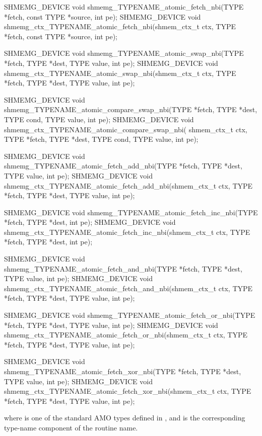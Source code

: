 \begin{apidefinition}
\begin{Csynopsis}
SHMEMG_DEVICE void shmemg_TYPENAME_atomic_fetch_nbi(TYPE *fetch,
    const TYPE *source, int pe);
SHMEMG_DEVICE void shmemg_ctx_TYPENAME_atomic_fetch_nbi(shmem_ctx_t ctx,
    TYPE *fetch, const TYPE *source, int pe);

SHMEMG_DEVICE void shmemg_TYPENAME_atomic_swap_nbi(TYPE *fetch,
    TYPE *dest, TYPE value, int pe);
SHMEMG_DEVICE void shmemg_ctx_TYPENAME_atomic_swap_nbi(shmem_ctx_t ctx,
    TYPE *fetch, TYPE *dest, TYPE value, int pe);

SHMEMG_DEVICE void shmemg_TYPENAME_atomic_compare_swap_nbi(TYPE *fetch,
    TYPE *dest, TYPE cond, TYPE value, int pe);
SHMEMG_DEVICE void shmemg_ctx_TYPENAME_atomic_compare_swap_nbi(
    shmem_ctx_t ctx, TYPE *fetch, TYPE *dest, TYPE cond,
    TYPE value, int pe);

SHMEMG_DEVICE void shmemg_TYPENAME_atomic_fetch_add_nbi(TYPE *fetch,
    TYPE *dest, TYPE value, int pe);
SHMEMG_DEVICE void shmemg_ctx_TYPENAME_atomic_fetch_add_nbi(shmem_ctx_t ctx,
    TYPE *fetch, TYPE *dest, TYPE value, int pe);

SHMEMG_DEVICE void shmemg_TYPENAME_atomic_fetch_inc_nbi(TYPE *fetch,
    TYPE *dest, int pe);
SHMEMG_DEVICE void shmemg_ctx_TYPENAME_atomic_fetch_inc_nbi(shmem_ctx_t ctx,
    TYPE *fetch, TYPE *dest, int pe);

SHMEMG_DEVICE void shmemg_TYPENAME_atomic_fetch_and_nbi(TYPE *fetch,
    TYPE *dest, TYPE value, int pe);
SHMEMG_DEVICE void shmemg_ctx_TYPENAME_atomic_fetch_and_nbi(shmem_ctx_t ctx,
    TYPE *fetch, TYPE *dest, TYPE value, int pe);

SHMEMG_DEVICE void shmemg_TYPENAME_atomic_fetch_or_nbi(TYPE *fetch,
    TYPE *dest, TYPE value, int pe);
SHMEMG_DEVICE void shmemg_ctx_TYPENAME_atomic_fetch_or_nbi(shmem_ctx_t ctx,
    TYPE *fetch, TYPE *dest, TYPE value, int pe);

SHMEMG_DEVICE void shmemg_TYPENAME_atomic_fetch_xor_nbi(TYPE *fetch,
    TYPE *dest, TYPE value, int pe);
SHMEMG_DEVICE void shmemg_ctx_TYPENAME_atomic_fetch_xor_nbi(shmem_ctx_t ctx,
    TYPE *fetch, TYPE *dest, TYPE value, int pe);
\end{Csynopsis}

where \TYPE{} is one of the standard AMO types defined in , and
\TYPENAME{} is the corresponding type-name component of the routine name.


\end{apidefinition}
